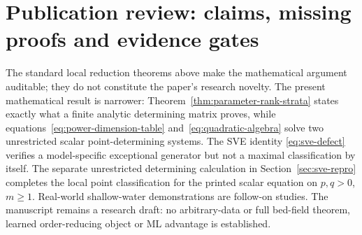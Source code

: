 \documentclass[11pt]{article}
\theoremstyle{definition}
\begin{document}
\clearpage
\section{Publication review: claims, missing proofs and evidence gates}
\label{sec:publication-review}
The standard local reduction theorems above make the mathematical argument
auditable; they do not constitute the paper's research novelty. The present
mathematical result is narrower: Theorem~\ref{thm:parameter-rank-strata}
states exactly what a finite analytic determining matrix proves, while
equations~\eqref{eq:power-dimension-table} and~\eqref{eq:quadratic-algebra}
solve two unrestricted scalar point-determining systems. The SVE identity
\eqref{eq:sve-defect} verifies a model-specific exceptional generator but not
a maximal classification by itself. The separate unrestricted determining
calculation in Section~\ref{sec:sve-repro} completes the local point
classification for the printed scalar equation on $p,q>0$, $m\geq1$.
Real-world shallow-water demonstrations are follow-on studies. The
manuscript remains a research draft: no arbitrary-data or full bed-field
theorem, learned order-reducing object or ML advantage is established.
\end{document}
